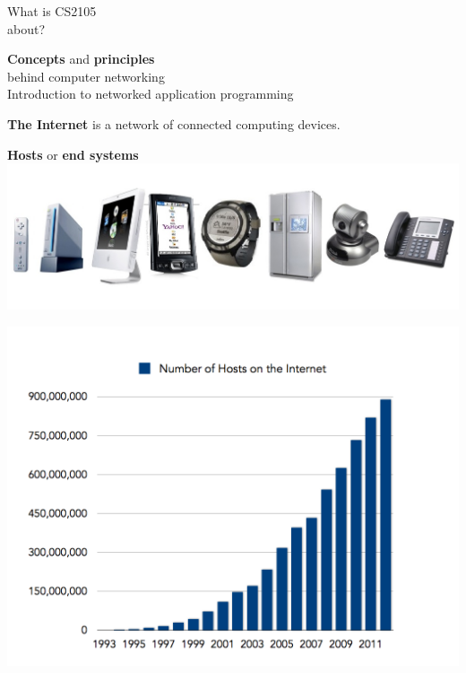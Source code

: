 \begin{frame}
\begin{center}
\large
What is
\large
CS2105\\
\large
about?
\end{center}
\end{frame}

\begin{frame}
\begin{center}
\large
\textbf{Concepts} and \textbf{principles}\\
behind computer networking\\[20pt]
\large
Introduction to networked application programming\\
\end{center}
\end{frame}

\begin{frame}
\begin{center}
\large
\textbf{The Internet} is a network of connected computing devices.
\end{center}
\end{frame}

\begin{frame}[plain]\begin{center}\large
		\textbf{Hosts} or \textbf{end systems} \\
		\includegraphics[width=\linewidth]{figures/end-host-examples.jpg}
\end{center}\end{frame}

\begin{frame}[plain]\begin{center}\large
		\includegraphics[width=\linewidth]{figures/num-of-hosts-chart.png}
\end{center}\end{frame}

